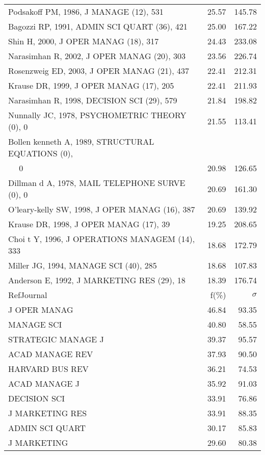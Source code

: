 \documentclass[a4paper,11pt]{report}
\begin{document}
\begin{landscape}
\begin{table}[!ht]
{\begin{tabular}{|l r r|}
Podsakoff PM, 1986, J MANAGE (12), 531 & 25.57 & 145.78\\
Bagozzi RP, 1991, ADMIN SCI QUART (36), 421 & 25.00 & 167.22\\
Shin H, 2000, J OPER MANAG (18), 317 & 24.43 & 233.08\\
Narasimhan R, 2002, J OPER MANAG (20), 303 & 23.56 & 226.74\\
Rosenzweig ED, 2003, J OPER MANAG (21), 437 & 22.41 & 212.31\\
Krause DR, 1999, J OPER MANAG (17), 205 & 22.41 & 211.93\\
Narasimhan R, 1998, DECISION SCI (29), 579 & 21.84 & 198.82\\
Nunnally JC, 1978, PSYCHOMETRIC THEORY (0), 0 & 21.55 & 113.41\\
Bollen kenneth A, 1989, STRUCTURAL EQUATIONS (0), &  & \\
$\quad$ 0 & 20.98 & 126.65\\
Dillman d A, 1978, MAIL TELEPHONE SURVE (0), 0 & 20.69 & 161.30\\
O'leary-kelly SW, 1998, J OPER MANAG (16), 387 & 20.69 & 139.92\\
Krause DR, 1998, J OPER MANAG (17), 39 & 19.25 & 208.65\\
Choi t Y, 1996, J OPERATIONS MANAGEM (14), 333 & 18.68 & 172.79\\
Miller JG, 1994, MANAGE SCI (40), 285 & 18.68 & 107.83\\
Anderson E, 1992, J MARKETING RES (29), 18 & 18.39 & 176.74\\
\hline
\hline
RefJournal & f(\%) & $\sigma$\\
\hline
J OPER MANAG & 46.84 & 93.35\\
MANAGE SCI & 40.80 & 58.55\\
STRATEGIC MANAGE J & 39.37 & 95.57\\
ACAD MANAGE REV & 37.93 & 90.50\\
HARVARD BUS REV & 36.21 & 74.53\\
ACAD MANAGE J & 35.92 & 91.03\\
DECISION SCI & 33.91 & 76.86\\
J MARKETING RES & 33.91 & 88.35\\
ADMIN SCI QUART & 30.17 & 85.83\\
J MARKETING & 29.60 & 80.38\\
\hline
\end{tabular}
}
\end{table}

\clearpage


\end{landscape}
\end{document}
